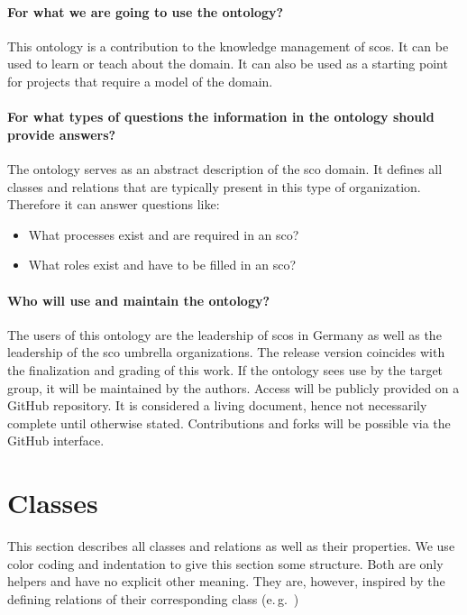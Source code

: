 \documentclass[a4paper, DIV=13, BCOR=0cm]{scrbook}
\newcommand{\eg}{e.\,g.\ }
\begin{document}
\paragraph{For what we are going to use the ontology?}
This ontology is a contribution to the knowledge management of \glspl{sco}. It can be used to learn or teach about the domain. It can also be used as a starting point for projects that require a model of the domain.

\paragraph{For what types of questions the information in the ontology should provide answers?}
The ontology serves as an abstract description of the \gls{sco} domain. It defines all classes and relations that are typically present in this type of organization. Therefore it can answer questions like:
\begin{itemize}
	\item What processes exist and are required in an \gls{sco}?
	\item What roles exist and have to be filled in an \gls{sco}?
\end{itemize}

\paragraph{Who will use and maintain the ontology?}
The users of this ontology are the leadership of \glspl{sco} in Germany as well as the leadership of the \gls{sco} umbrella organizations. The release version coincides with the finalization and grading of this work. If the ontology sees use by the target group, it will be maintained by the authors. Access will be publicly provided on a GitHub repository. It is considered a living document, hence not necessarily complete until otherwise stated. Contributions and forks will be possible via the GitHub interface.

\section{Classes }
This section describes all classes and relations as well as their properties. We use color coding and indentation to give this section some structure. Both are only helpers and have no explicit other meaning. They are, however, inspired by the defining relations of their corresponding class (\eg )
\end{document}
